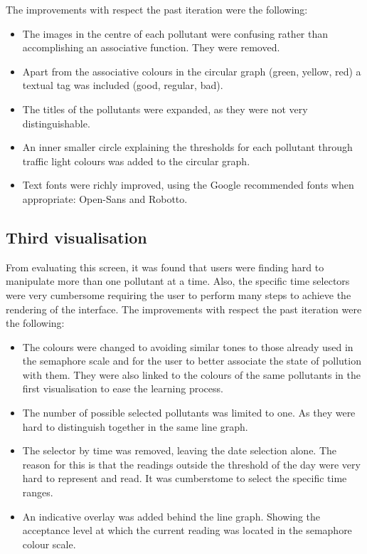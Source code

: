 The improvements with respect the past iteration were the following:
\begin{itemize}
    \item The images in the centre of each pollutant were confusing rather than accomplishing an associative function. They were removed.
    \item Apart from the associative colours in the circular graph (green, yellow, red) a textual tag was included (good, regular, bad).
    \item The titles of the pollutants were expanded, as they were not very distinguishable. 
    \item An inner smaller circle explaining the thresholds for each pollutant through traffic light colours was added to the circular graph. 
    \item Text fonts were richly improved, using the Google recommended fonts when appropriate:  Open-Sans and Robotto.	
\end{itemize}

\subsection{Third visualisation}
From evaluating this screen, it was found that users were finding hard to manipulate more than one pollutant at a time. Also, the specific time selectors were very cumbersome requiring the user to perform many steps to achieve the rendering of the interface. 
The improvements with respect the past iteration were the following:
\begin{itemize}
    \item The colours were changed to avoiding similar tones to those already used in the semaphore scale and for the user to better associate the state of pollution with them. They were also linked to the colours of the same pollutants in the first visualisation to ease the learning process.
    \item The number of possible selected pollutants was limited to one. As they were hard to distinguish together in the same line graph. 
    \item The selector by time was removed, leaving the date selection alone. The reason for this is that the readings outside the threshold of the day were very hard to represent and read. It was cumberstome to select the specific time ranges. 
    \item An indicative overlay was added behind the line graph. Showing the acceptance level at which the current reading was located in the semaphore colour scale. 
\end{itemize}

